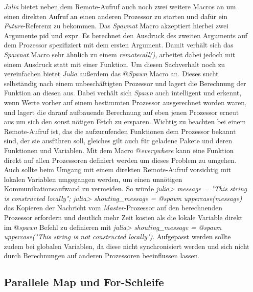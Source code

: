 \documentclass[proseminar,german,utf8]{zihpub}
\begin{document}
\textit{Julia} bietet neben dem Remote-Aufruf auch noch zwei weitere Macros an um einen direkten Aufruf an einen anderen Prozessor zu starten und dafür ein \textit{Future}-Referenz zu bekommen. Das \textit{Spawnat} Macro akzeptiert hierbei zwei Argumente pid und expr. Es berechnet den Ausdruck des zweiten Arguments auf dem Prozessor spezifiziert mit dem ersten Argument.  Damit verhält sich das \textit{Spawnat} Macro sehr ähnlich zu einem \textit{remotecall()}, arbeitet dabei jedoch mit einem Ausdruck statt mit einer Funktion. Um diesen Sachverhalt noch zu vereinfachen bietet \textit{Julia} außerdem das @\textit{Spawn} Macro an. Dieses sucht selbständig nach einem unbeschäftigten Prozessor und lagert die Berechnung der Funktion an diesen aus. Dabei verhält sich \textit{Spawn} auch intelligent und erkennt, wenn Werte vorher auf einem bestimmten Prozessor ausgerechnet worden waren, und lagert die darauf aufbauende Berechnung auf eben jenen Prozessor erneut aus um sich den sonst nötigen Fetch zu ersparen. Wichtig zu beachten bei einem Remote-Aufruf ist, das die aufzurufenden Funktionen dem Prozessor bekannt sind, der sie ausführen soll, gleiches gilt auch für geladene Pakete und deren Funktionen und Variablen. Mit dem Macro @\textit{everywhere} kann eine Funktion direkt auf allen Prozessoren definiert werden um dieses Problem zu umgehen. Auch sollte beim Umgang mit einem direkten Remote-Aufruf vorsichtig mit lokalen Variablen umgegangen werden, um einen unnötigen Kommunikationsaufwand zu vermeiden. So würde \textit{julia> message = "This string is constructed locally";
julia> shouting\_message = @spawn uppercase(message)} das Kopieren der Nachricht vom \textit{Master}-Prozessor auf den berechnenden Prozessor erfordern und deutlich mehr Zeit kosten als die lokale Variable direkt im @\textit{spawn} Befehl zu definieren mit \textit{julia> shouting\_message = @spawn uppercase("This string is not constructed locally")}. Aufgepasst werden sollte zudem bei globalen Variablen, da diese nicht synchronisiert werden und sich nicht durch Berechnungen auf anderen Prozessoren beeinflussen lassen.

\subsection{Parallele Map und For-Schleife }
\end{document}
